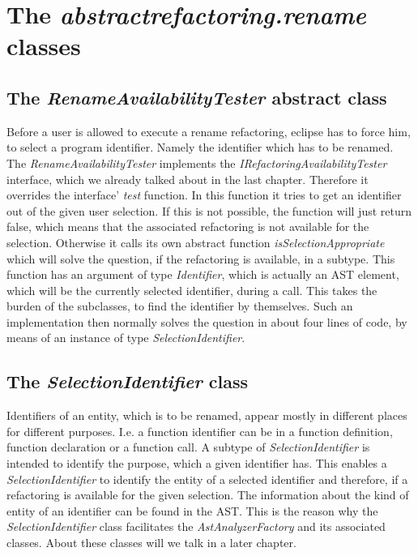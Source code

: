 \documentclass[a4paper,10pt]{report}
\begin{document}
\section{The {\it abstractrefactoring.rename} classes}
\subsection{The {\it RenameAvailabilityTester} abstract class}
Before a user is allowed to execute a rename refactoring, eclipse has to force him, to select a program identifier. Namely the identifier which has to be renamed.
The {\it RenameAvailabilityTester} implements the {\it IRefactoringAvailabilityTester} interface, which we already talked about in the last chapter.
Therefore it overrides the interface' {\it test} function. In this function it tries to get an identifier out of the given user selection. If this is not possible, the function will just return false, which means that the associated refactoring is not available for the selection.
Otherwise it calls its own abstract function {\it isSelectionAppropriate} which will solve the question, if the refactoring is available, in a subtype. This function has an argument of type {\it Identifier}, which is actually an AST element, which will be the currently selected identifier, during a call. 
This takes the burden of the subclasses, to find the identifier by themselves.
Such an implementation then normally solves the question in about four lines of code, by means of an instance of type {\it SelectionIdentifier}. 

\subsection{The {\it SelectionIdentifier} class}
\label{SelectionIdentifier}
Identifiers of an entity, which is to be renamed, appear mostly in different places for different purposes. I.e. a function identifier can be in a function definition, function declaration or a function call. 
A subtype of {\it SelectionIdentifier} is intended to identify the purpose, which a given identifier has.
This enables a {\it SelectionIdentifier} to identify the entity of a selected identifier and therefore, if a refactoring is available for the given selection. The information about the kind of entity of an identifier can  be found in the AST. 
This is the reason why the {\it SelectionIdentifier} class facilitates the {\it AstAnalyzerFactory} and its associated classes. About these classes will we talk in a later chapter.
\end{document}
